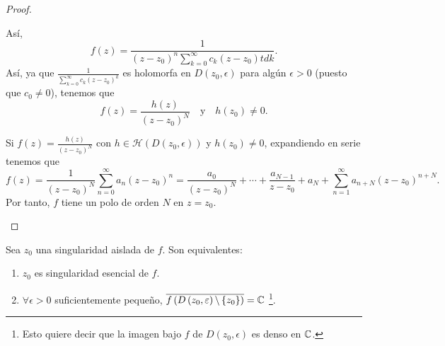 \begin{proof}
\begin{description}
Así, 
\[f\left(z\right)=\frac{1}{\left(z-z_{0}\right)^{n}\sum^{\infty}_{k = 0}c_{k}\left(z-z_{0}\right)tdk} .\]
Así, ya que $\displaystyle \frac{1}{\sum^{\infty}_{k = 0}c_{k}\left(z-z_{0}\right)^{k}} $ es holomorfa en $\displaystyle D\left(z_{0}, \epsilon \right) $ para algún $\displaystyle \epsilon > 0 $ (puesto que $\displaystyle c_{0}\neq 0 $), tenemos que 
\[f\left(z\right)=\frac{h\left(z\right)}{\left(z-z_{0}\right)^{N}}\quad \text{y} \quad h\left(z_{0}\right)\neq 0 .\]
\item[(4) $\displaystyle \Rightarrow $ (1)] Si $\displaystyle f \left(z\right)=\frac{h\left(z\right)}{\left(z-z_{0}\right)^{N}} $ con $\displaystyle h \in \mathcal{H}\left(D\left(z_{0}, \epsilon \right)\right) $ y $\displaystyle h\left(z_{0}\right)\neq 0 $, expandiendo en serie tenemos que 
	\[f\left(z\right)=\frac{1}{\left(z-z_{0}\right)^{N}}\sum^{\infty}_{n = 0}a_{n}\left(z-z_{0}\right)^{n} = \frac{a_{0}}{\left(z-z_{0}\right)^{N}}+ \cdots + 
	\frac{a_{N-1}}{z-z_{0}}+a_{N}+\sum^{\infty }_{n = 1}a_{n+ N}\left(z-z_{0}\right)^{n + N}.\]
	Por tanto, $\displaystyle f $ tiene un polo de orden $\displaystyle N $ en $\displaystyle z = z_{0} $. 
\end{description}
\end{proof}
\begin{theorem}
Sea $\displaystyle z_{0} $ una singularidad aislada de $\displaystyle f $. Son equivalentes:
\begin{enumerate}
\item $\displaystyle z_{0} $ es singularidad esencial de $\displaystyle f $.
\item $\displaystyle \forall \epsilon > 0 $ suficientemente pequeño, $\displaystyle \overline{f\left(D\left(z_{0}, \varepsilon \right) \backslash \left\{ z_{0}\right\} \right)}=\mathbb{C} $ \footnote{Esto quiere decir que la imagen bajo $\displaystyle f $ de $\displaystyle D\left(z_{0}, \epsilon \right) $ es denso en $\displaystyle \mathbb{C} $.}. 
\end{enumerate}
\end{theorem}

